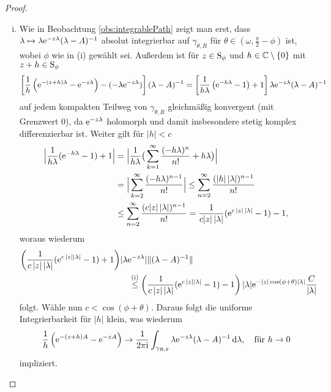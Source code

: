 \begin{proof}
\begin{enumerate}[(i)]
    \item Wie in Beobachtung \ref{obs:integrablePath} zeigt man erst, dass $\lambda \mapsto \lambda \mathrm{e}^{-z\lambda}(\lambda - A)^{-1}$ absolut integrierbar auf $\gamma_{\theta,R}$ für $\theta \in (\omega, \frac{\pi}{2} - \phi)$ ist, wobei $\phi$ wie in (i) gewählt sei.
      Außerdem ist für $z \in \mathrm{S}_\phi$ und $h \in \mathbb{C}\setminus\{0\}$ mit $z + h \in \mathrm{S}_\phi$ 
      $$
      \left[ \frac{1}{h} \left( \mathrm{e}^{-(z + h)\lambda} - \mathrm{e}^{-z\lambda} \right) - (- \lambda \mathrm{e}^{-z\lambda}) \right] (\lambda - A)^{-1}
      = \left[ \frac{1}{h\lambda} \left( \mathrm{e}^{-h\lambda} - 1\right) + 1\right] \lambda \mathrm{e}^{-z\lambda}  (\lambda - A)^{-1}
      $$
      auf jedem kompakten Teilweg von $\gamma_{\theta,R}$ gleichmäßig konvergent (mit Grenzwert 0), da $\mathrm{e}^{-z\lambda}$ holomorph und damit insbesondere stetig komplex differenzierbar ist.
      Weiter gilt für $|h| < c$
      \begin{align*}
        \Big| \frac{1}{h\lambda} (\mathrm{e}^{-h\lambda} - 1) + 1 \Big|
        &= \Big| \frac{1}{h\lambda} \big(\sum_{k = 1}^\infty \frac{(-h\lambda)^{n}}{n!} + h\lambda \big) \Big| \\
        &= \Big| \sum_{k = 2}^\infty \frac{(-h \lambda)^{n - 1}}{n!} \Big|
        \leq \sum_{n = 2}^\infty \frac{(|h| \, |\lambda|)^{n - 1}}{n!} \\
        &\leq \sum_{n = 2}^\infty \frac{(c |z| \, |\lambda|)^{n - 1}}{n!}
        = \frac{1}{c|z|\, |\lambda|} (\mathrm{e}^{c\,|z|\,|\lambda|} - 1) - 1,
      \end{align*}
      woraus wiederum
      \begin{align*}
        \left( \frac{1}{c\, |z|\, |\lambda|} (\mathrm{e}^{c\, |z| |\lambda|} - 1) + 1 \right) & | \lambda \mathrm{e}^{-z\lambda} | \| (\lambda - A)^{-1} \| \\
        &\quad\overset{\mathrm{(i)}}{\leq} \left( \frac{1}{c\, |z|\, |\lambda|} (\mathrm{e}^{c\, |z| |\lambda|} - 1) - 1 \right) | \lambda| \mathrm{e}^{-|z|\cos(\phi + \theta) |\lambda|} \frac{C}{|\lambda|}
      \end{align*}
      folgt.
      Wähle nun $c < \cos(\phi + \theta)$.
      Daraus folgt die uniforme Integrierbarkeit für $|h|$ klein, was wiederum
      $$
      \frac{1}{h} \left(\mathrm{e}^{-(z + h)A} - \mathrm{e}^{-zA} \right) \to 
      \frac{1}{2\pi \mathrm{i}} \int_{\gamma_{R, \theta}} \lambda \mathrm{e}^{-z\lambda}(\lambda - A)^{-1} \, {\operatorname{d}\!{\lambda}}, \quad\text{für } h \to 0
      $$
      impliziert.


\end{enumerate}
\end{proof}
